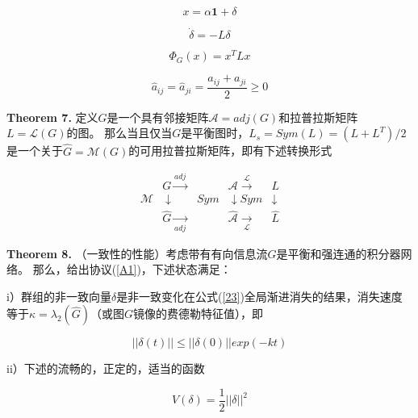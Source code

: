 \documentclass{article}
\begin{document}
\begin{equation}
    x = \alpha \mathbf{1} + \delta
    \tag{22}
    \label{22}
\end{equation}

\begin{equation}
    \dot{\delta} = -L\delta
    \tag{23}
    \label{23}
\end{equation}

\begin{equation}
    \Phi_G(x) = x^T Lx
    \tag{24}
    \label{24}
\end{equation}

\begin{equation}
    \hat{a}_{ij}=\hat{a}_{ji}=\frac{a_{ij}+a_{ji}}{2}\ge 0
    \tag{25}
    \label{25}
\end{equation}

\noindent \textbf{Theorem 7.} 定义$G$是一个具有邻接矩阵$\mathcal{A}=adj(G)$和拉普拉斯矩阵$L=\mathcal{L}(G)$的图。
那么当且仅当$G$是平衡图时，$L_s = Sym(L) = (L+L^T)/2$是一个关于$\hat{G}=\mathcal{M}(G)$的可用拉普拉斯矩阵，即有下述转换形式

\begin{equation}
    \begin{aligned}
                    &G \xrightarrow{adj}         &\mathcal{A} \xrightarrow{\mathcal{L}}          &L \\
        \mathcal{M} &\downarrow \quad\quad Sym   &\downarrow  Sym                      &\downarrow \\
                    &\hat{G} \xrightarrow[adj]{} &\hat{\mathcal{A}} \xrightarrow[\mathcal{L}]{}  &\hat{L} 
    \end{aligned}
    \tag{26}
    \label{26}
\end{equation}

\noindent\textbf{Theorem 8.} （一致性的性能）考虑带有有向信息流$G$是平衡和强连通的积分器网络。
那么，给出协议(\ref{A1})，下述状态满足：

i）群组的非一致向量$\delta$是非一致变化在公式(\ref{23})全局渐进消失的结果，消失速度等于$\kappa=\lambda_2(\hat{G})$（或图$G$镜像的费德勒特征值），即

\begin{equation}
    \tag{27}
    \label{27}
    ||\delta(t)||\le ||\delta(0)||exp(-kt)
\end{equation}

ii）下述的流畅的，正定的，适当的函数

\begin{equation}
    \tag{28}
    \label{28}
    V(\delta) = \frac{1}{2}||\delta||^2
\end{equation}
\end{document}
